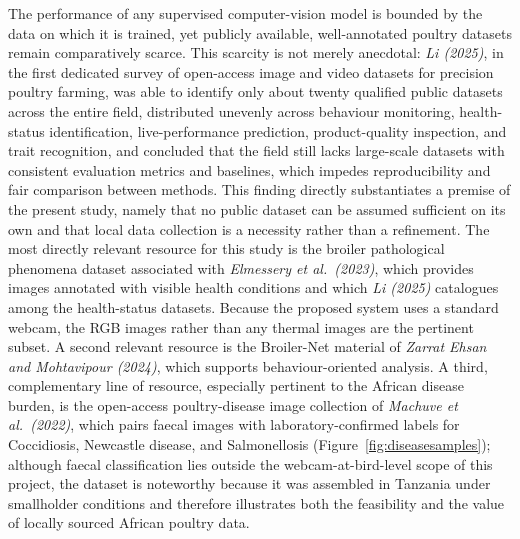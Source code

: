 \documentclass[12pt,a4paper]{report}
\begin{document}
The performance of any supervised computer-vision model is bounded by the data on which it is trained, yet publicly available, well-annotated poultry datasets remain comparatively scarce. This scarcity is not merely anecdotal: \textit{Li (2025)}, in the first dedicated survey of open-access image and video datasets for precision poultry farming, was able to identify only about twenty qualified public datasets across the entire field, distributed unevenly across behaviour monitoring, health-status identification, live-performance prediction, product-quality inspection, and trait recognition, and concluded that the field still lacks large-scale datasets with consistent evaluation metrics and baselines, which impedes reproducibility and fair comparison between methods. This finding directly substantiates a premise of the present study, namely that no public dataset can be assumed sufficient on its own and that local data collection is a necessity rather than a refinement. The most directly relevant resource for this study is the broiler pathological phenomena dataset associated with \textit{Elmessery et al.\ (2023)}, which provides images annotated with visible health conditions and which \textit{Li (2025)} catalogues among the health-status datasets. Because the proposed system uses a standard webcam, the RGB images rather than any thermal images are the pertinent subset. A second relevant resource is the Broiler-Net material of \textit{Zarrat Ehsan and Mohtavipour (2024)}, which supports behaviour-oriented analysis. A third, complementary line of resource, especially pertinent to the African disease burden, is the open-access poultry-disease image collection of \textit{Machuve et al.\ (2022)}, which pairs faecal images with laboratory-confirmed labels for Coccidiosis, Newcastle disease, and Salmonellosis (Figure~\ref{fig:diseasesamples}); although faecal classification lies outside the webcam-at-bird-level scope of this project, the dataset is noteworthy because it was assembled in Tanzania under smallholder conditions and therefore illustrates both the feasibility and the value of locally sourced African poultry data.
\end{document}
